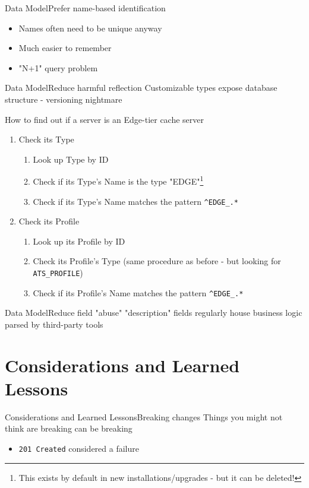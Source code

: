 \documentclass[10pt]{beamer}
\newcommand{\code}[1]{\texorpdfstring{\texttt{\color{inlinecodecolor}#1}}{#1}}
\begin{document}
\begin{frame}{Data Model}{Prefer name-based identification}
	\begin{itemize}
		\item Names often need to be unique anyway
		\item Much easier to remember
		\item "N+1" query problem
	\end{itemize}
\end{frame}

\begin{frame}{Data Model}{Reduce harmful reflection}
Customizable types expose database structure - versioning nightmare
	\begin{block}{How to find out if a server is an Edge-tier cache server}
		\begin{enumerate}
			\item<1-> Check its Type
			\begin{enumerate}
				\item<2-> Look up Type by ID
				\item<3-> Check if its Type's Name is the type "EDGE"\footnote{This exists by default in new installations/upgrades - but it can be deleted!}
				\item<4-> Check if its Type's Name matches the pattern \code{\^{}EDGE\_.*}
			\end{enumerate}
			\item<5-> Check its Profile
			\begin{enumerate}
				\item<6-> Look up its Profile by ID
				\item<7-> Check its Profile's Type (same procedure as before - but looking for \code{ATS\_PROFILE})
				\item<8-> Check if its Profile's Name matches the pattern \code{\^{}EDGE\_.*}
			\end{enumerate}
		\end{enumerate}
	\end{block}
\end{frame}

\begin{frame}{Data Model}{Reduce field "abuse"}
"description" fields regularly house business logic parsed by third-party tools
\end{frame}

\section{Considerations and Learned Lessons}
\begin{frame}{Considerations and Learned Lessons}{Breaking changes}
Things you might not think are breaking can be breaking

	\begin{itemize}
		\item<2-> \code{201 Created} considered a failure
	\end{itemize}

\end{frame}
\end{document}
